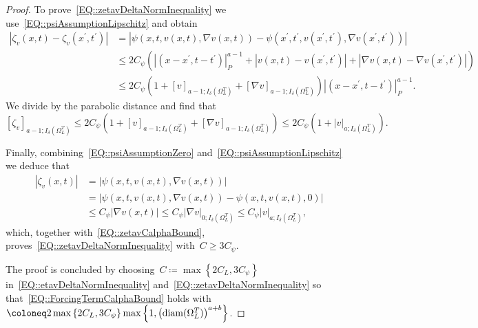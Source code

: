 \documentclass[12pt,a4paper]{amsart}
\makeatletter
\numberwithin{equation}{section}
\theoremstyle{definition}
\theoremstyle{remark}
\newcommand{\abs}[1]{\left\lvert#1\right\rvert}
\renewcommand{\leq}{\leqslant}
\renewcommand{\geq}{\geqslant}
\newcommand{\const}[1]{%
  \csname const@#1\endcsname%
}
\makeatother
\begin{document}
\begin{proof}
    To prove~\eqref{EQ::zetavDeltaNormInequality} we use~\eqref{EQ::psiAssumptionLipschitz} and obtain
    \begin{align}
        \abs{\zeta_v(x,t) - \zeta_v(x^\prime, t^\prime)}
            &= \abs{\psi(x,t,v(x,t),\nabla v(x,t)) - \psi(x^\prime,t^\prime,v(x^\prime,t^\prime),\nabla v(x^\prime,t^\prime))}\\
            &\leq 2C_\psi \left( \abs{(x-x^\prime, t-t^\prime)}_{P}^{a-1} + \abs{v(x,t) - v(x^\prime,t^\prime)} + \abs{\nabla v(x,t) - \nabla v(x^\prime,t^\prime)} \right)\\
            &\leq 2C_\psi \left( 1 + {[v]}_{a-1;I_\delta(\Omega_L^T)} + {[\nabla v]}_{a-1;I_\delta(\Omega_L^T)}\right)\abs{(x-x^\prime, t-t^\prime)}_{P}^{a-1}.
    \end{align}
    We divide by the parabolic distance and find that
    \begin{equation}\label{EQ::zetavCalphaBound}
        {[\zeta_v]}_{a-1; I_\delta(\Omega_L^T)} \leq 2C_\psi \left( 1 + {[v]}_{a-1;I_\delta(\Omega_L^T)} + {[\nabla v]}_{a-1;I_\delta(\Omega_L^T)}\right) \leq 2C_\psi \left( 1 + \abs{v}_{a;I_\delta(\Omega_L^T)}\right).
    \end{equation}

    Finally, combining~\eqref{EQ::psiAssumptionZero} and~\eqref{EQ::psiAssumptionLipschitz} we deduce that
    \begin{align}
        \abs{\zeta_v(x,t)}
            &= \abs{\psi(x,t,v(x,t),\nabla v(x,t))}\\
            &= \abs{\psi(x,t,v(x,t),\nabla v(x,t)) - \psi(x,t,v(x,t),0)}\\
            &\leq C_\psi \abs{\nabla v(x,t)} \leq C_\psi \abs{\nabla v}_{0;I_\delta(\Omega_L^T)} \leq C_\psi \abs{v}_{a; I_\delta(\Omega_L^T)},
    \end{align}
    which, together with~\eqref{EQ::zetavCalphaBound}, proves~\eqref{EQ::zetavDeltaNormInequality} with~$C \geq 3C_\psi$.
    
    The proof is concluded by choosing~$C \coloneq \max\left\{2C_L, 3C_\psi\right\}$ in~\eqref{EQ::etavDeltaNormInequality} and~\eqref{EQ::zetavDeltaNormInequality} so that~\eqref{EQ::ForcingTermCalphaBound} holds with~$\const{CONST::ForcingTermCalphaBound} \coloneq 2\max\left\{2C_L, 3C_\psi\right\}\max\left\{1,{\left(\operatorname{diam}(\Omega_L^T)\right)}^{a+b}\right\}$.
\end{proof}
\end{document}
